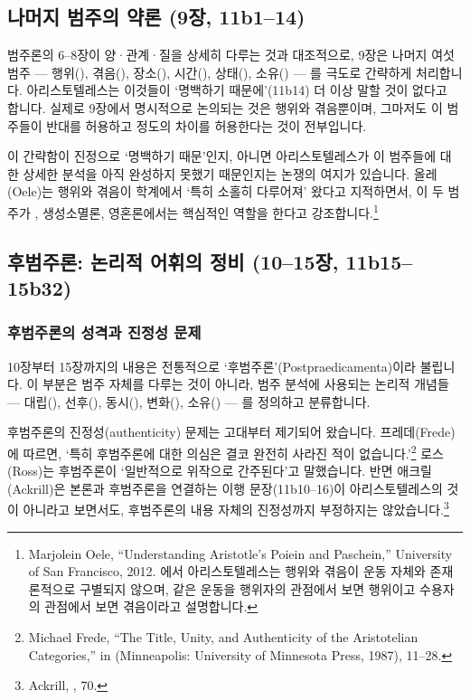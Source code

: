 \documentclass[12pt, a4paper]{article}
\begin{document}
\thispagestyle{firstpage}


\subsection{나머지 범주의 약론 (9장, 11b1--14)}

범주론의 6--8장이 양·관계·질을 상세히 다루는 것과 대조적으로, 9장은 나머지 여섯 범주 --- 행위(), 겪음(), 장소(), 시간(), 상태(), 소유() --- 를 극도로 간략하게 처리합니다. 아리스토텔레스는 이것들이 `명백하기 때문에'(11b14) 더 이상 말할 것이 없다고 합니다. 실제로 9장에서 명시적으로 논의되는 것은 행위와 겪음뿐이며, 그마저도 이 범주들이 반대를 허용하고 정도의 차이를 허용한다는 것이 전부입니다.

이 간략함이 진정으로 `명백하기 때문'인지, 아니면 아리스토텔레스가 이 범주들에 대한 상세한 분석을 아직 완성하지 못했기 때문인지는 논쟁의 여지가 있습니다. 올레(Oele)는 행위와 겪음이 학계에서 `특히 소홀히 다루어져' 왔다고 지적하면서, 이 두 범주가 , 생성소멸론, 영혼론에서는 핵심적인 역할을 한다고 강조합니다.\footnote{Marjolein Oele, ``Understanding Aristotle's Poiein and Paschein,'' University of San Francisco, 2012. 에서 아리스토텔레스는 행위와 겪음이 운동 자체와 존재론적으로 구별되지 않으며, 같은 운동을 행위자의 관점에서 보면 행위이고 수용자의 관점에서 보면 겪음이라고 설명합니다.}

\subsection{후범주론: 논리적 어휘의 정비 (10--15장, 11b15--15b32)}

\subsubsection{후범주론의 성격과 진정성 문제}

10장부터 15장까지의 내용은 전통적으로 `후범주론'(Postpraedicamenta)이라 불립니다. 이 부분은 범주 자체를 다루는 것이 아니라, 범주 분석에 사용되는 논리적 개념들 --- 대립(), 선후(), 동시(), 변화(), 소유() --- 를 정의하고 분류합니다.

후범주론의 진정성(authenticity) 문제는 고대부터 제기되어 왔습니다. 프레데(Frede)에 따르면, `특히 후범주론에 대한 의심은 결코 완전히 사라진 적이 없습니다.'\footnote{Michael Frede, ``The Title, Unity, and Authenticity of the Aristotelian Categories,'' in  (Minneapolis: University of Minnesota Press, 1987), 11--28.} 로스(Ross)는 후범주론이 `일반적으로 위작으로 간주된다'고 말했습니다. 반면 애크릴(Ackrill)은 본론과 후범주론을 연결하는 이행 문장(11b10--16)이 아리스토텔레스의 것이 아니라고 보면서도, 후범주론의 내용 자체의 진정성까지 부정하지는 않았습니다.\footnote{Ackrill, , 70.}
\end{document}
